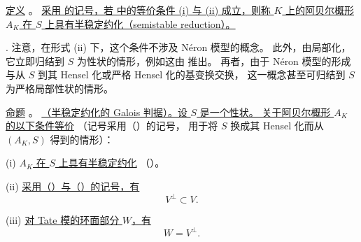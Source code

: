 \medskip
\noindent
\underline{定义} 。
\underline{采用  的记号，若 
中的等价条件 (i) 与 (ii) 成立，则称 $K$ 上的阿贝尔概形 $A_K$ 在 $S$ 上具有半稳定约化（semistable reduction）。}

\medskip
\noindent
{}. 注意，在形式 (ii) 下，这个条件不涉及 N\'eron 模型的概念。
此外，由局部化，它立即归结到 $S$ 为性状的情形，例如这由  推出。
再者，由于 N\'eron 模型的形成与从 $S$ 到其 Hensel 化或严格 Hensel 化的基变换交换，
这一概念甚至可归结到 $S$ 为严格局部性状的情形。



\medskip
\noindent
\underline{命题} 。
\underline{（半稳定约化的 Galois 判据）。设 $S$ 是一个性状。
关于阿贝尔概形 $A_K$ 的以下条件等价}
（记号采用（）的记号，
用于将 $S$ 换成其 Hensel 化而从 $(A_K,S)$ 得到的情形）：

\smallskip
\noindent
(i) \underline{$A_K$ 在 $S$ 上具有半稳定约化}
（）。

\smallskip
\noindent
(ii) \underline{采用（）与（）的记号，有}
\[
 V^\perp\subset V.
\]

\noindent
(iii) \underline{对 Tate 模的环面部分 $W$，有}
\[
 W=V^\perp.
\]

